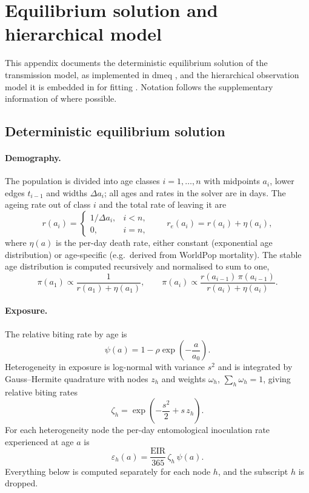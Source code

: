\section{Equilibrium solution and hierarchical model}
\label{section:equilibrium}

This appendix documents the deterministic equilibrium solution of the \citet{griffin_estimates_2014} transmission model, as implemented in dmeq \citep{Charles2024}, and the hierarchical observation model it is embedded in for fitting \citep{Charles2026Msinf}. Notation follows the supplementary information of \citet{griffin_estimates_2014} where possible.

\subsection{Deterministic equilibrium solution}

\paragraph{Demography.} The population is divided into age classes $i = 1, \dots, n$ with midpoints $a_i$, lower edges $t_{i-1}$ and widths $\Delta a_i$; all ages and rates in the solver are in days. The ageing rate out of class $i$ and the total rate of leaving it are
\begin{equation*}
r(a_i) = \begin{cases}
1/\Delta a_i, & i < n, \\
0, & i = n,
\end{cases}
\qquad
r_e(a_i) = r(a_i) + \eta(a_i),
\end{equation*}
where $\eta(a)$ is the per-day death rate, either constant (exponential age distribution) or age-specific (e.g.\ derived from WorldPop mortality). The stable age distribution is computed recursively and normalised to sum to one,
\begin{equation*}
\pi(a_1) \propto \frac{1}{r(a_1) + \eta(a_1)},
\qquad
\pi(a_i) \propto \frac{r(a_{i-1})\,\pi(a_{i-1})}{r(a_i) + \eta(a_i)}.
\end{equation*}

\paragraph{Exposure.} The relative biting rate by age is
\begin{equation*}
\psi(a) = 1 - \rho \exp\!\left(-\frac{a}{a_0}\right).
\end{equation*}
Heterogeneity in exposure is log-normal with variance $s^2$ and is integrated by Gauss--Hermite quadrature with nodes $z_h$ and weights $\omega_h$, $\sum_h \omega_h = 1$, giving relative biting rates
\begin{equation*}
\zeta_h = \exp\!\left(-\frac{s^2}{2} + s\,z_h\right).
\end{equation*}
For each heterogeneity node the per-day entomological inoculation rate experienced at age $a$ is
\begin{equation*}
\varepsilon_h(a) = \frac{\mathrm{EIR}}{365}\,\zeta_h\,\psi(a).
\end{equation*}
Everything below is computed separately for each node $h$, and the subscript $h$ is dropped.

